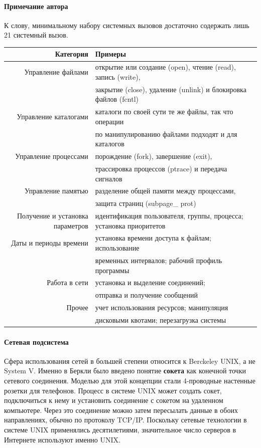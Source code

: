 \documentclass[10pt]{article}
\begin{document}
	\paragraph{Примечание автора} К слову, минимальному набору системных вызовов достаточно содержать лишь 21 системный вызов.
	\begin{table}[h!t]
		\begin{tabular}{r | l}
			Категория             & Примеры\\\hline
			Управление файлами    & открытие или создание (open), чтение (read), запись (write),\\
			                      & закрытие (close), удаление (unlink) и блокировка файлов (fcntl)\\\hline
			Управление каталогами & каталоги по своей сути те же файлы, так что операции\\
			                      & по манипулированию файлами подходят и для каталогов\\\hline
			Управление процессами & порождение (fork), завершение (exit),\\
			                      & трассировка процессов (ptrace) и передача сигналов\\\hline
			Управление памятью    & разделение общей памяти между процессами,\\
			                      & защита страниц (subpage\_ prot)\\\hline
			Получение и установка параметров & идентификация пользователя, группы, процесса; установка приоритетов\\\hline
			Даты и периоды времени & установка времени доступа к файлам; использование\\
			                       & временных интервалов; рабочий профиль программы\\\hline
			Работа в сети & установка и выделение соединений;\\
			              & отправка и получение сообщений\\\hline
			Прочее & учет использования ресурсов; манипуляция\\
			       & дисковыми квотами; перезагрузка системы\\\hline
		\end{tabular}
	\end{table}
	\paragraph{Сетевая подсистема}
	Сфера использования сетей в большей степени относится к Berckeley UNIX, а не System V. Именно в Беркли было введено понятие \textbf{сокета} как конечной точки сетевого соединения. Моделью для этой концепции стали 4-проводные настенные розетки для телефонов. Процесс в системе UNIX может создать сокет, подключиться к нему и установить соединение с сокетом на удаленном компьютере. Через это соединение можно затем пересылать данные в обоих направлениях, обычно по протоколу TCP/IP. Поскольку сетевые технологии в системе UNIX применялись десятилетиями, значительное число серверов в Интернете используют именно UNIX.
\end{document}
